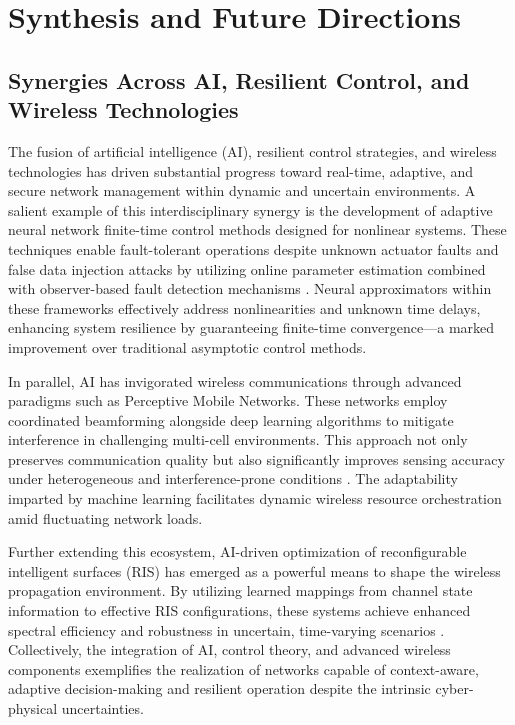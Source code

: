 \section{Synthesis and Future Directions}

\subsection{Synergies Across AI, Resilient Control, and Wireless Technologies}

The fusion of artificial intelligence (AI), resilient control strategies, and wireless technologies has driven substantial progress toward real-time, adaptive, and secure network management within dynamic and uncertain environments. A salient example of this interdisciplinary synergy is the development of adaptive neural network finite-time control methods designed for nonlinear systems. These techniques enable fault-tolerant operations despite unknown actuator faults and false data injection attacks by utilizing online parameter estimation combined with observer-based fault detection mechanisms \cite{ref46}. Neural approximators within these frameworks effectively address nonlinearities and unknown time delays, enhancing system resilience by guaranteeing finite-time convergence—a marked improvement over traditional asymptotic control methods.

In parallel, AI has invigorated wireless communications through advanced paradigms such as Perceptive Mobile Networks. These networks employ coordinated beamforming alongside deep learning algorithms to mitigate interference in challenging multi-cell environments. This approach not only preserves communication quality but also significantly improves sensing accuracy under heterogeneous and interference-prone conditions \cite{ref47}. The adaptability imparted by machine learning facilitates dynamic wireless resource orchestration amid fluctuating network loads.

Further extending this ecosystem, AI-driven optimization of reconfigurable intelligent surfaces (RIS) has emerged as a powerful means to shape the wireless propagation environment. By utilizing learned mappings from channel state information to effective RIS configurations, these systems achieve enhanced spectral efficiency and robustness in uncertain, time-varying scenarios \cite{ref48}. Collectively, the integration of AI, control theory, and advanced wireless components exemplifies the realization of networks capable of context-aware, adaptive decision-making and resilient operation despite the intrinsic cyber-physical uncertainties.


